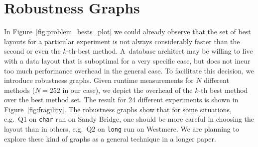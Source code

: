 \documentclass{sig-alternate}
\begin{document}




\vspace*{-0.2cm}

\section{Robustness Graphs}

In Figure~\ref{fig:problem_bests_plot} we could already observe that the set of best layouts for a particular experiment is not always considerably faster than the second or even the $k$-th-best method. A~database architect may be willing to live with a data layout that is suboptimal for a very specific case, but does not incur too much performance overhead in the general case. To facilitate this decision, we introduce robustness graphs. Given runtime measurements for $N$ different methods ($N=252$ in our case), we depict the overhead of the $k$-th best method over the best method set. The result for 24 different experiments is shown in Figure~\ref{fig:fragility}. The robustness graphs show that for some situations, e.g.~Q1 on \texttt{char} run on Sandy Bridge, one should be more careful in choosing the layout than in others, e.g.~Q2 on \texttt{long} run on Westmere. We are planning to explore these kind of graphs as a general technique in a longer  paper.
\end{document}
